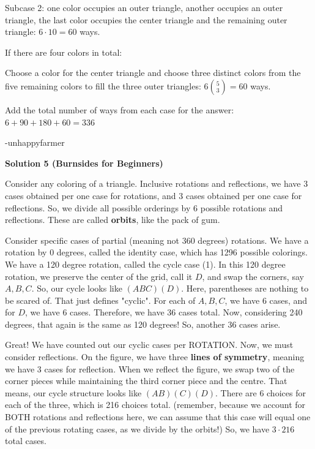\begin{enumerate}
 Subcase 2: one color occupies an outer triangle, another occupies an outer triangle, the last color occupies the center triangle and the remaining outer triangle: $6\cdot10=60$ ways.

 
If there are four colors in total:

 Choose a color for the center triangle and choose three distinct colors from the five remaining colors to fill the three outer triangles: $6\binom{5}{3}=60$ ways. 

 
Add the total number of ways from each case for the answer: $6+90+180+60=\boxed{336}$

 -unhappyfarmer

 



\textbf{Solution 5 (Burnsides for Beginners)}

Consider any coloring of a triangle. Inclusive rotations and reflections, we have 3 cases obtained per one case for rotations, and 3 cases obtained per one case for reflections. So, we divide all possible orderings by 6 possible rotations and reflections. These are called \textbf{orbits}, like the pack of gum.

 Consider specific cases of partial (meaning not 360 degrees) rotations. We have a rotation by 0 degrees, called the identity case, which has 1296 possible colorings. We have a 120 degree rotation, called the cycle case (1). In this 120 degree rotation, we preserve the center of the grid, call it $D$, and swap the corners, say $A, B, C$. So, our cycle looks like $(ABC)(D)$. Here, parentheses are nothing to be scared of. That just defines "cyclic". For each of $A,B,C$, we have 6 cases, and for $D$, we have 6 cases. Therefore, we have 36 cases total. Now, considering 240 degrees, that again is the same as 120 degrees! So, another 36 cases arise.

 Great! We have counted out our cyclic cases per ROTATION. Now, we must consider reflections. On the figure, we have three \textbf{lines of symmetry}, meaning we have 3 cases for reflection. When we reflect the figure, we swap two of the corner pieces while maintaining the third corner piece and the centre. That means, our cycle structure looks like $(AB)(C)(D)$. There are 6 choices for each of the three, which is 216 choices total. (remember, because we account for BOTH rotations and reflections here, we can assume that this case will equal one of the previous rotating cases, as we divide by the orbits!) So, we have $3 \cdot 216$ total cases.


\end{enumerate}
